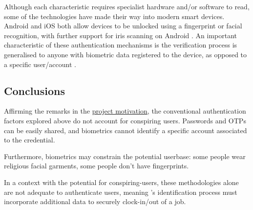 Although each characteristic requires specialist hardware
and/or software to read, some of the technologies have made
their way into modern smart devices.
Android and iOS both allow devices to be unlocked using a
fingerprint or facial recognition, with further support for
iris scanning on Android \parencite{androidBiometrics,
  touchId, faceId}.
An important characteristic of these authentication
mechanisms is the verification process is generalised to
anyone with biometric data registered to the device, as
opposed to a specific user/account \parencite[][Return
  value of getAuthenticationType()]
{androidBiometricAuthResult}.

\subsection{Conclusions}

Affirming the remarks in the
\hyperref[s:motivation]{project motivation}, the
conventional authentication factors explored above do not
account for conspiring users.
Passwords and OTPs can be easily shared, and biometrics
cannot identify a specific account associated to the
credential.

Furthermore, biometrics may constrain the potential
userbase: some people wear religious facial garments, some
people don't have fingerprints.

In a context with the potential for \gls{conspiring-users},
these methodologies alone are not adequate to authenticate
users, meaning \projectname{}'s identification process must
incorporate additional data to securely \gls{clock-in}/out
of a job.
